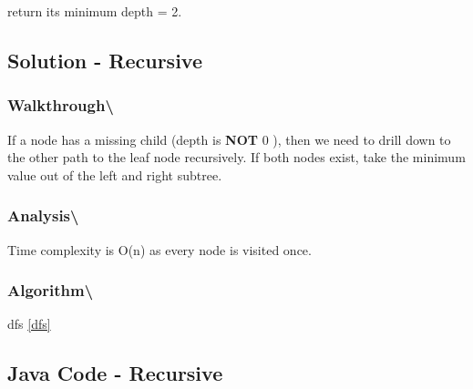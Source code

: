 \documentclass[]{book}
\begin{document}
return its minimum depth = 2.

\hypertarget{solution---recursive-3}{%
\subsection{Solution - Recursive}\label{solution---recursive-3}}

\hypertarget{walkthrough-75}{%
\subsubsection{Walkthrough\textbackslash{}}\label{walkthrough-75}}

If a node has a missing child (depth is \textbf{NOT} 0 ), then we need to drill down to the other
path to the leaf node recursively. If both nodes exist, take the minimum value out of the left and right subtree.

\hypertarget{analysis-82}{%
\subsubsection{Analysis\textbackslash{}}\label{analysis-82}}

Time complexity is O(n) as every node is visited once.

\hypertarget{algorithm-83}{%
\subsubsection{Algorithm\textbackslash{}}\label{algorithm-83}}

dfs \ref{dfs}

\hypertarget{java-code---recursive-3}{%
\subsection{Java Code - Recursive}\label{java-code---recursive-3}}
\end{document}
